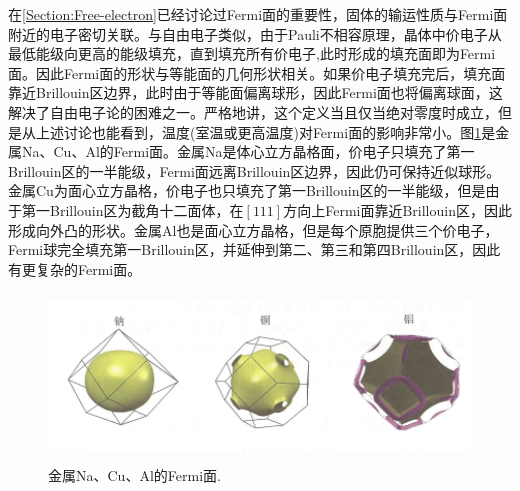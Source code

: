 在\ref{Section:Free-electron}已经讨论过Fermi面的重要性，固体的输运性质与Fermi面附近的电子密切关联。与自由电子类似，由于Pauli不相容原理，晶体中价电子从最低能级向更高的能级填充，直到填充所有价电子,此时形成的填充面即为Fermi面。因此Fermi面的形状与等能面的几何形状相关。如果价电子填充完后，填充面靠近Brillouin区边界，此时由于等能面偏离球形，因此Fermi面也将偏离球面，这解决了自由电子论的困难之一。严格地讲，这个定义当且仅当绝对零度时成立，但是从上述讨论也能看到，温度(室温或更高温度)对Fermi面的影响非常小。图\ref{Fig:Fermi_Surface-metal}是金属Na、Cu、Al的Fermi面。金属Na是体心立方晶格面，价电子只填充了第一Brillouin区的一半能级，Fermi面远离Brillouin区边界，因此仍可保持近似球形。金属Cu为面心立方晶格，价电子也只填充了第一Brillouin区的一半能级，但是由于第一Brillouin区为截角十二面体，在$[111]$方向上Fermi面靠近Brillouin区，因此形成向外凸的形状。金属Al也是面心立方晶格，但是每个原胞提供三个价电子，Fermi球完全填充第一Brillouin区，并延伸到第二、第三和第四Brillouin区，因此有更复杂的Fermi面。
\begin{figure}[h!]
\centering
\vspace*{-0.10in}
\includegraphics[height=1.75in,width=4.50in,viewport=0 0 100 34,clip]{Figures/Fermi_Surface-metal.png}
\caption{\small \textrm{金属Na、Cu、Al的Fermi面.}}%
\label{Fig:Fermi_Surface-metal}
\end{figure}

